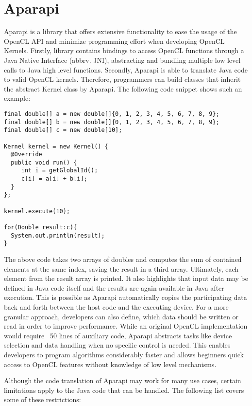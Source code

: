 \section{Aparapi}
\label{aparapi}
Aparapi is a library that offers extensive functionality to ease the usage of the OpenCL API and minimize programming effort when developing OpenCL Kernels. Firstly, library contains bindings to access OpenCL functions through a Java Native Interface (abbrv. JNI), abstracting and bundling multiple low level calls to Java high level functions. Secondly, Aparapi is able to translate Java code to valid OpenCL kernels. Therefore, programmers can build classes that inherit the abstract Kernel class by Aparapi. The following code snippet shows such an example:

\begin{lstlisting}
final double[] a = new double[]{0, 1, 2, 3, 4, 5, 6, 7, 8, 9};
final double[] b = new double[]{0, 1, 2, 3, 4, 5, 6, 7, 8, 9};
final double[] c = new double[10];

Kernel kernel = new Kernel() {
  @Override
  public void run() {
     int i = getGlobalId();
     c[i] = a[i] + b[i];
  }
};

kernel.execute(10);

for(Double result:c){
  System.out.println(result);
}
\end{lstlisting}

The above code takes two arrays of doubles and computes the sum of contained elements at the same index, saving the result in a third array. Ultimately, each element from the result array is printed. It also highlights that input data may be defined in Java code itself and the results are again available in Java after execution. This is possible as Aparapi automatically copies the participating data back and forth between the host code and the executing device. For a more granular approach, developers can also define, which data should be written or read in order to improve performance. While an original OpenCL implementation would require ~50 lines of auxiliary code, Aparapi abstracts tasks like device selection and data handling when no specific control is needed. This enables developers to program algorithms considerably faster and allows beginners quick access to OpenCL features without knowledge of low level mechanisms.

Although the code translation of Aparapi may work for many use cases, certain limitations apply to the Java code that can be handled. The following list covers some of these restrictions:

